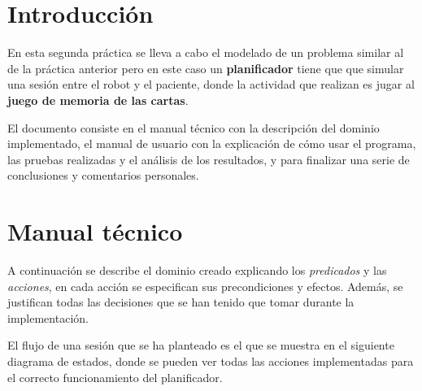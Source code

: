 \documentclass{uc3mpracticas}
\begin{document}
  \frontmatter



  \vspace{55mm}


  \newpage

  \tableofcontents

  \newpage

  \mainmatter

  \section{Introducción}

  En esta segunda práctica se lleva a cabo el modelado de un problema similar al de la práctica anterior pero en este caso un \textbf{planificador} tiene que que simular una sesión entre el robot y el paciente, donde la actividad que realizan es jugar al \textbf{juego de memoria de las cartas}.

  \vspace{2mm}

  El documento consiste en el manual técnico con la descripción del dominio implementado, el manual de usuario con la explicación de cómo usar el programa, las pruebas realizadas y el análisis de los resultados, y para finalizar una serie de conclusiones y comentarios personales.

  \section{Manual técnico}

  A continuación se describe el dominio creado explicando los \textit{predicados} y las \textit{acciones}, en cada acción se especifican sus precondiciones y efectos. Además, se justifican todas las decisiones que se han tenido que tomar durante la implementación.

  \vspace{2mm}

  El flujo de una sesión que se ha planteado es el que se muestra en el siguiente diagrama de estados, donde se pueden ver todas las acciones implementadas para el correcto funcionamiento del planificador.
\end{document}
